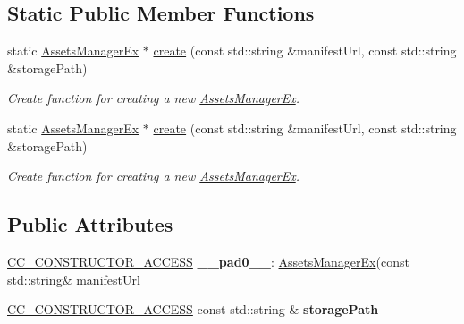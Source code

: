 \subsection*{Static Public Member Functions}
\begin{DoxyCompactItemize}
\item 
static \hyperlink{classAssetsManagerEx}{Assets\+Manager\+Ex} $\ast$ \hyperlink{classAssetsManagerEx_a12c15aa87bf72150103ec0adf9720d6d}{create} (const std\+::string \&manifest\+Url, const std\+::string \&storage\+Path)
\begin{DoxyCompactList}\small\item\em Create function for creating a new \hyperlink{classAssetsManagerEx}{Assets\+Manager\+Ex}. \end{DoxyCompactList}\item 
static \hyperlink{classAssetsManagerEx}{Assets\+Manager\+Ex} $\ast$ \hyperlink{classAssetsManagerEx_a87c4409b1ddaaffbeca620a6333b676f}{create} (const std\+::string \&manifest\+Url, const std\+::string \&storage\+Path)
\begin{DoxyCompactList}\small\item\em Create function for creating a new \hyperlink{classAssetsManagerEx}{Assets\+Manager\+Ex}. \end{DoxyCompactList}\end{DoxyCompactItemize}
\subsection*{Public Attributes}
\begin{DoxyCompactItemize}
\item 
\mbox{\label{classAssetsManagerEx_ad84b2b2550b54909ed70bb5967fbd413}} 
\hyperlink{_2cocos2d_2cocos_2base_2ccConfig_8h_a25ef1314f97c35a2ed3d029b0ead6da0}{C\+C\+\_\+\+C\+O\+N\+S\+T\+R\+U\+C\+T\+O\+R\+\_\+\+A\+C\+C\+E\+SS} {\bfseries \+\_\+\+\_\+pad0\+\_\+\+\_\+}\+: \hyperlink{classAssetsManagerEx}{Assets\+Manager\+Ex}(const std\+::string\& manifest\+Url
\item 
\mbox{\label{classAssetsManagerEx_a2bda39d5bfe0bb6532c051558e4e91eb}} 
\hyperlink{_2cocos2d_2cocos_2base_2ccConfig_8h_a25ef1314f97c35a2ed3d029b0ead6da0}{C\+C\+\_\+\+C\+O\+N\+S\+T\+R\+U\+C\+T\+O\+R\+\_\+\+A\+C\+C\+E\+SS} const std\+::string \& {\bfseries storage\+Path}
\end{DoxyCompactItemize}
